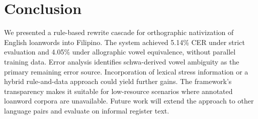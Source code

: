 \section{Conclusion}

We presented a rule-based rewrite cascade for orthographic nativization of
English loanwords into Filipino. The system achieved 5.14\% CER under strict
evaluation and 4.05\% under allographic vowel equivalence, without parallel
training data. Error analysis identifies schwa-derived vowel ambiguity as the
primary remaining error source. Incorporation of lexical stress information or
a hybrid rule-and-data approach could yield further gains. The framework's
transparency makes it suitable for low-resource scenarios where annotated
loanword corpora are unavailable. Future work will extend the approach to other
language pairs and evaluate on informal register text.